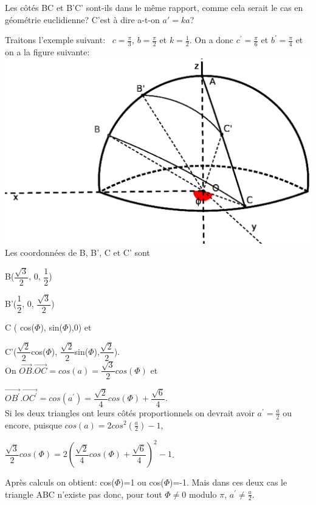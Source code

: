 \documentclass[a4paper, 12pt, twoside]{book}
\begin{document}
  Les côtés BC et B'C' sont-ils dans le même rapport, comme cela serait le cas en géométrie euclidienne? C'est à dire a-t-on $a'=ka$?\
  
  
  Traitons l'exemple suivant: \ $c=\frac{\pi}{3}$,  $b=\frac{\pi}{2}$ et $k=\frac{1}{2}$. On a donc $c^{'}=\frac{\pi}{6}$ et $b^{'}=\frac{\pi}{4}$ et on a la figure suivante:\\
  

 
 \includegraphics[scale=0.7]{figures/demi-sphre2ter.eps} \\
 
 Les coordonnées de B, B', C et C' sont \
 
 B($\dfrac{\sqrt{3}}{2}$, 0, $\dfrac{1}{2}$)\
 
 B'($\dfrac{1}{2}$, 0, $\dfrac{\sqrt{3}}{2}$)\
 
 C ( cos($\Phi$), sin($\Phi$),0) et \
 
 C'($\dfrac{\sqrt{2}}{2}$cos($\Phi$), $\dfrac{\sqrt{2}}{2}$sin($\Phi$),$\dfrac{\sqrt{2}}{2}$).\\
 
 On $\vec{OB}.\vec{OC}=cos(a)=\dfrac{\sqrt{3}}{2}cos(\Phi)$ et\
 
  $\vec{OB^{'}}.\vec{OC^{'}}=cos(a^{'})=\dfrac{\sqrt{2}}{4}cos(\Phi)+\dfrac{\sqrt{6}}{4}$.\\
  
  Si les deux triangles ont leurs côtés proportionnels on devrait avoir $a^{'}=\frac{a}{2}$ ou encore, puisque $cos(a)=2cos^{2}(\frac{a}{2})-1$,\
  
 $\dfrac{\sqrt{3}}{2}cos(\Phi)=2(\dfrac{\sqrt{2}}{4}cos(\Phi)+\dfrac{\sqrt{6}}{4})^{2}-1$. \
 
 Après calculs on obtient: cos($\Phi$)=1 ou cos($\Phi$)=-1. Mais dans ces deux cas le triangle ABC n'existe pas donc, pour tout $\Phi\neq 0$ modulo $\pi$, $a^{'}\neq\frac{a}{2}$.\
 
\end{document}
